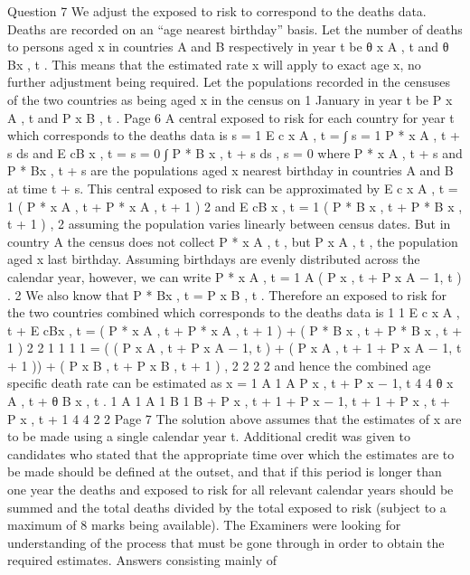 \documentclass[a4paper,12pt]{article}
\begin{document}
\begin{enumerate}
Question 7
We adjust the exposed to risk to correspond to the deaths data.
Deaths are recorded on an “age nearest birthday” basis. Let the number of deaths to persons
aged x in countries A and B respectively in year t be θ x A , t and θ Bx , t .
This means that the estimated rate \mu x will apply to exact age x, no further adjustment being
required.
Let the populations recorded in the censuses of the two countries as being aged x in the
census on 1 January in year t be P x A , t and P x B , t .
Page 6 %
A central exposed to risk for each country for year t which corresponds to the deaths data is
s = 1
E c x A , t =
∫
s = 1
P * x A , t + s ds
and
E cB x , t =
s = 0
∫
P * B x , t + s ds ,
s = 0
where P * x A , t + s and P * Bx , t + s are the populations aged x nearest birthday in countries A and B at
time t + s.
This central exposed to risk can be approximated by
E c x A , t =
1
( P * x A , t + P * x A , t + 1 )
2
and
E cB x , t =
1
( P * B x , t + P * B x , t + 1 ) ,
2
assuming the population varies linearly between census dates.
But in country A the census does not collect P * x A , t , but P x A , t , the population aged x last
birthday.
Assuming birthdays are evenly distributed across the calendar year, however, we can write
P * x A , t =
1 A
( P x , t + P x A − 1, t ) .
2
We also know that P * Bx , t = P x B , t .
Therefore an exposed to risk for the two countries combined which corresponds to the deaths
data is
1
1
E c x A , t + E cBx , t = ( P * x A , t + P * x A , t + 1 ) + ( P * B x , t + P * B x , t + 1 )
2
2
1 1
1
1
= ( ( P x A , t + P x A − 1, t ) + ( P x A , t + 1 + P x A − 1, t + 1 )) + ( P x B , t + P x B , t + 1 ) ,
2 2
2
2
and hence the combined age specific death rate can be estimated as
\mu x =
1 A 1 A
P x , t + P x − 1, t
4
4
θ x A , t + θ B x , t
.
1 A
1 A
1 B 1 B
+ P x , t + 1 + P x − 1, t + 1 + P x , t + P x , t + 1
4
4
2
2
Page 7 %
The solution above assumes that the estimates of \mu x are to be made using a single calendar
year t. Additional credit was given to candidates who stated that the appropriate time over
which the estimates are to be made should be defined at the outset, and that if this period is
longer than one year the deaths and exposed to risk for all relevant calendar years should be
summed and the total deaths divided by the total exposed to risk (subject to a maximum of 8
marks being available). The Examiners were looking for understanding of the process that
must be gone through in order to obtain the required estimates. Answers consisting mainly of

\end{enumerate}
\end{document}
